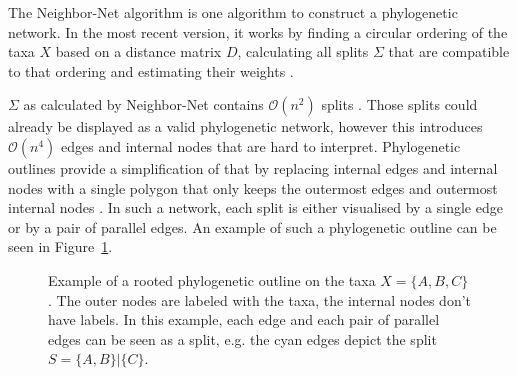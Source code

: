 The Neighbor-Net algorithm \cite{bryantNeighborNetAgglomerativeMethod2004} is
one algorithm to construct a phylogenetic network. In the most recent version,
it works by finding a circular ordering of the taxa $X$ based on a distance matrix
$D$, calculating all splits $\Sigma$ that are compatible to that ordering and
estimating their weights \cite{bryantNeighborNetImprovedAlgorithms2023}. 

$\Sigma$ as calculated by Neighbor-Net contains $\mathcal{O}(n^2)$ splits
\cite{bryantNeighborNetImprovedAlgorithms2023}. Those splits could already be
displayed as a valid phylogenetic network, however this introduces
$\mathcal{O}(n^4)$ edges and internal nodes
\cite{bagciMicrobialPhylogeneticContext2021} that are hard to interpret.
Phylogenetic outlines provide a simplification of that by replacing internal
edges and internal nodes with a single polygon that only keeps the outermost
edges and outermost internal nodes \cite{bagciMicrobialPhylogeneticContext2021}.
In such a network, each split is either visualised by a single edge or by a pair
of parallel edges. An example of such a phylogenetic outline can be seen in
Figure~\ref{fig:outlineExample}. 

\begin{figure}
  \centering
  \caption[Example of a rooted phylogenetic outline]{Example of a rooted
  phylogenetic outline on the taxa $X = \{A, B, C\}$. The outer nodes are
  labeled with the taxa, the internal nodes don't have labels. In this example,
  each edge and each pair of parallel edges can be seen as a split, e.g. the
  cyan edges depict the split $S = \{A, B\} | \{C\}$.}
  \label{fig:outlineExample}
\end{figure}

